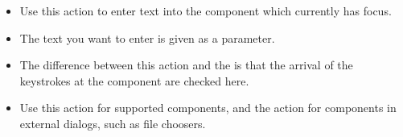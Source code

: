 
\begin{itemize}
\item Use this action to enter text into the component which currently has focus.
\item The text you want to enter is given as a parameter.
\item The difference between this action and the  is that the arrival of the keystrokes at the component are checked here. 
\item Use this action for supported components, and the   action for components in external dialogs, such as file choosers. 
\end{itemize}


